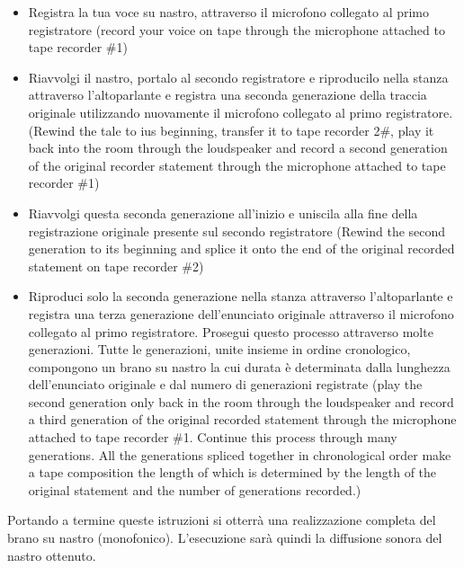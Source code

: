\begin{itemize}
    \item Registra la tua voce su nastro, attraverso il microfono collegato al primo registratore (record your voice on tape through the microphone attached to tape recorder \#1)
\end{itemize}

\begin{itemize}
    \item Riavvolgi il nastro, portalo al secondo registratore e riproducilo nella stanza attraverso l'altoparlante e registra una seconda generazione della traccia originale utilizzando nuovamente il microfono collegato al primo registratore. (Rewind the tale to ius beginning, transfer it to tape recorder 2\#, play it back into the room through the loudspeaker and record a second generation of the original recorder statement through the microphone attached to tape recorder \#1)
\end{itemize}

\begin{itemize}
    \item Riavvolgi questa seconda generazione all'inizio e uniscila alla fine della registrazione originale presente sul secondo registratore (Rewind the second generation to its beginning and splice it onto the end of the original recorded statement on tape recorder \#2)
\end{itemize}

\begin{itemize}
    \item Riproduci solo la seconda generazione nella stanza attraverso l'altoparlante e registra una terza generazione dell'enunciato originale attraverso il microfono collegato al primo registratore. Prosegui questo processo attraverso molte generazioni. Tutte le generazioni, unite insieme in ordine cronologico, compongono un brano su nastro la cui durata è determinata dalla lunghezza dell'enunciato originale e dal numero di generazioni registrate (play the second generation only back in the room through the loudspeaker and record a third generation of the original recorded statement through the microphone attached to tape recorder \#1. Continue this process through many generations. All the generations spliced together in chronological order make a tape composition the length of which is determined by the length of the original statement and the number of generations recorded.)
\end{itemize}

Portando a termine queste istruzioni si otterrà una realizzazione completa del brano su nastro (monofonico). L'esecuzione sarà quindi la diffusione sonora del nastro ottenuto.


